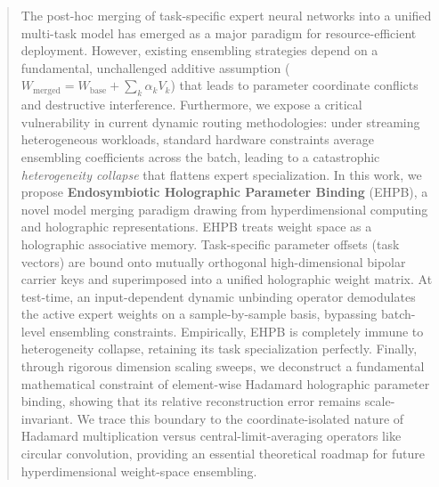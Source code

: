 \begin{abstract}
The post-hoc merging of task-specific expert neural networks into a unified multi-task model has emerged as a major paradigm for resource-efficient deployment. However, existing ensembling strategies depend on a fundamental, unchallenged additive assumption ($W_{\text{merged}} = W_{\text{base}} + \sum_k \alpha_k V_k$) that leads to parameter coordinate conflicts and destructive interference. Furthermore, we expose a critical vulnerability in current dynamic routing methodologies: under streaming heterogeneous workloads, standard hardware constraints average ensembling coefficients across the batch, leading to a catastrophic \textit{heterogeneity collapse} that flattens expert specialization. In this work, we propose \textbf{Endosymbiotic Holographic Parameter Binding} (EHPB), a novel model merging paradigm drawing from hyperdimensional computing and holographic representations. EHPB treats weight space as a holographic associative memory. Task-specific parameter offsets (task vectors) are bound onto mutually orthogonal high-dimensional bipolar carrier keys and superimposed into a unified holographic weight matrix. At test-time, an input-dependent dynamic unbinding operator demodulates the active expert weights on a sample-by-sample basis, bypassing batch-level ensembling constraints. Empirically, EHPB is completely immune to heterogeneity collapse, retaining its task specialization perfectly. Finally, through rigorous dimension scaling sweeps, we deconstruct a fundamental mathematical constraint of element-wise Hadamard holographic parameter binding, showing that its relative reconstruction error remains scale-invariant. We trace this boundary to the coordinate-isolated nature of Hadamard multiplication versus central-limit-averaging operators like circular convolution, providing an essential theoretical roadmap for future hyperdimensional weight-space ensembling.
\end{abstract}
